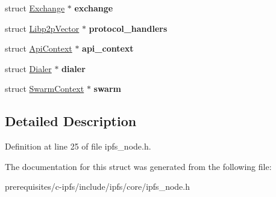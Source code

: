 \begin{DoxyCompactItemize}
struct \mbox{\hyperlink{struct_exchange}{Exchange}} $\ast$ {\bfseries exchange}
\item 
\mbox{\label{struct_ipfs_node_afdfbbb76faac2a04fb07376d05d5efc8}} 
struct \mbox{\hyperlink{struct_libp2p_vector}{Libp2p\+Vector}} $\ast$ {\bfseries protocol\+\_\+handlers}
\item 
\mbox{\label{struct_ipfs_node_a0633227cbf3a767b9ae9d6d1d981cd4e}} 
struct \mbox{\hyperlink{struct_api_context}{Api\+Context}} $\ast$ {\bfseries api\+\_\+context}
\item 
\mbox{\label{struct_ipfs_node_a1a59d0ef3a4f23fefe6a6bf3dfd9bd9e}} 
struct \mbox{\hyperlink{struct_dialer}{Dialer}} $\ast$ {\bfseries dialer}
\item 
\mbox{\label{struct_ipfs_node_aabb7266b1a09a5e577330ccd87ba26a8}} 
struct \mbox{\hyperlink{struct_swarm_context}{Swarm\+Context}} $\ast$ {\bfseries swarm}
\end{DoxyCompactItemize}


\subsection{Detailed Description}


Definition at line 25 of file ipfs\+\_\+node.\+h.



The documentation for this struct was generated from the following file\+:\begin{DoxyCompactItemize}
\item 
prerequisites/c-\/ipfs/include/ipfs/core/ipfs\+\_\+node.\+h\end{DoxyCompactItemize}
